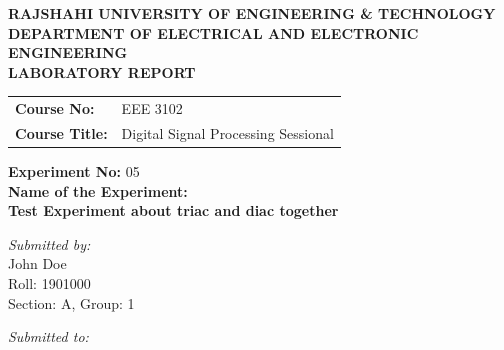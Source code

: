 \documentclass[12pt,a4paper]{article}
\begin{document}
\begin{titlepage}
    \sffamily
    \centering
    \vspace*{1cm}
    
    \Large \textbf{\MakeUppercase{ Rajshahi University of Engineering \& Technology }} \\
    \vspace{0.5cm}
    \large \textbf{\MakeUppercase{ Department of Electrical and Electronic Engineering }} \\
    
    \vspace{2.5cm}
    \Large \textbf{LABORATORY REPORT} \\
    \vspace{1cm}
    
    \begin{tabular}{ll}
        \textbf{Course No:} & EEE 3102 \\
        \textbf{Course Title:} & Digital Signal Processing Sessional \\
    \end{tabular}
    
    \vspace{2cm}
    
    \textbf{Experiment No:} 05 \\
    \vspace{0.5cm}
    \textbf{Name of the Experiment:} \\
    \Large \textbf{ Test Experiment about triac and diac together } \\
    
    \vspace{2.5cm}
    
    \begin{minipage}[t]{0.4\textwidth}
        \begin{flushleft} \large
            \emph{Submitted by:}\\
            John Doe \\
            Roll: 1901000 \\
            Section: A, Group: 1
        \end{flushleft}
    \end{minipage}
    \hfill
    \begin{minipage}[t]{0.5\textwidth}
        \begin{flushright} \large
            \emph{Submitted to:} \\
            

\end{flushright}
\end{minipage}
\end{titlepage}
\end{document}
